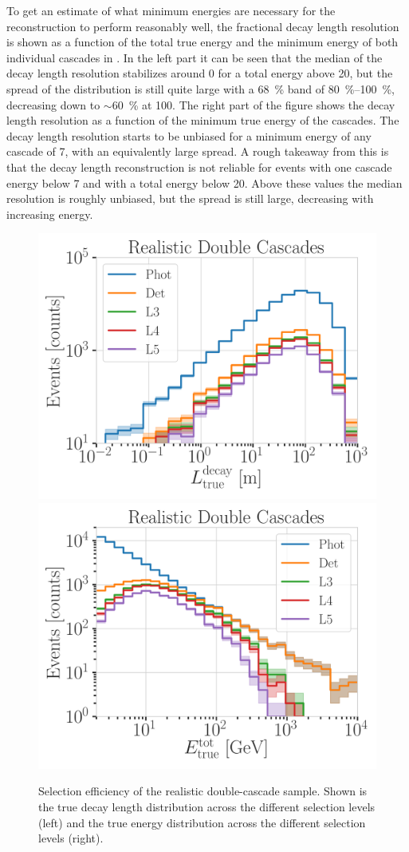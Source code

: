 To get an estimate of what minimum energies are necessary for the reconstruction to perform reasonably well, the fractional decay length resolution is shown as a function of the total true energy and the minimum energy of both individual cascades in . In the left part it can be seen that the median of the decay length resolution stabilizes around 0 for a total energy above \SI{20}{\gev}, but the spread of the distribution is still quite large with a \SI{68}{\percent} band of \SIrange{80}{100}{\percent}, decreasing down to $\sim$\SI{60}{\percent} at \SI{100}{\gev}. The right part of the figure shows the decay length resolution as a function of the minimum true energy of the cascades. The decay length resolution starts to be unbiased for a minimum energy of any cascade of \SI{7}{\gev}, with an equivalently large spread. A rough takeaway from this is that the decay length reconstruction is not reliable for events with one cascade energy below \SI{7}{\gev} and with a total energy below \SI{20}{\gev}. Above these values the median resolution is roughly unbiased, but the spread is still large, decreasing with increasing energy.


\begin{figure}[h]
	\centering
    \includegraphics[width=0.49\linewidth]{figures/model_independent_simulation/results/realistic/selection/hnl_selection_efficiency_decay_l_true_unweighted.png}
    \includegraphics[width=0.49\linewidth]{figures/model_independent_simulation/results/realistic/selection/hnl_selection_efficiency_energy_true_unweighted.png}
    \caption[Realistic double-cascade selection efficiency]{Selection efficiency of the realistic  double-cascade sample. Shown is the true decay length distribution across the different selection levels (left) and the true energy distribution across the different selection levels (right).}
\end{figure}



